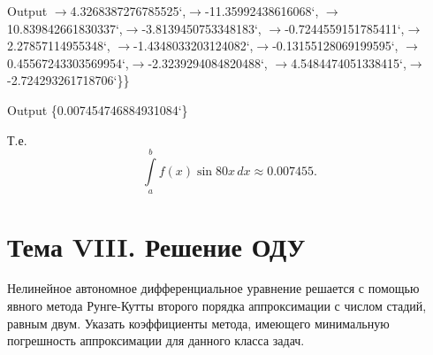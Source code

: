 \documentclass[a4paper]{article}
\begin{document}
\begin{sol}
\begin{mmaCell}[]{Output}
  \(\to\)4.3268387276785525`,\(\to\)-11.35992438616068`,
  \(\to\)10.839842661830337`,\(\to\)-3.8139450753348183`,
  \(\to\)-0.7244559151785411`,\(\to\)2.27857114955348`,
  \(\to\)-1.4348033203124082`,\(\to\)-0.13155128069199595`,
  \(\to\)0.45567243303569954`,\(\to\)-2.3239294084820488`,
  \(\to\)4.5484474051338415`,\(\to\)-2.724293261718706`\}\}
\end{mmaCell}
\begin{mmaCell}[]{Output}
  \{0.007454746884931084`\}
\end{mmaCell}
Т.\:е.
\[
	\int\limits_{a}^{b} f(x) \sin 80 x \, dx \approx
	0.007455
.\] 
\end{sol}
\section*{Тема VIII. Решение ОДУ}
\begin{hiProb}[7.6]
Нелинейное автономное дифференциальное уравнение решается
с помощью явного метода Рунге-Кутты второго порядка аппроксимации
с числом стадий, равным двум. Указать коэффициенты метода, имеющего
 минимальную погрешность аппроксимации для данного класса задач.
\end{hiProb}
\end{document}

